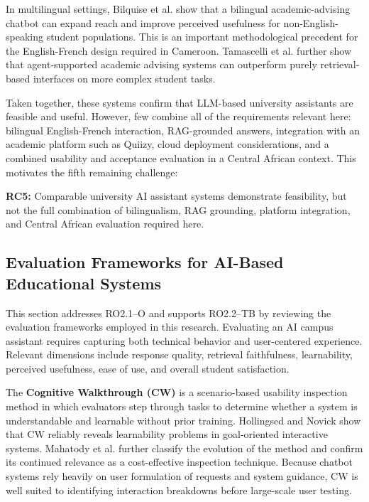 \documentclass[a4paper,9pt,twocolumn]{extarticle}
\begin{document}
In multilingual settings, Bilquise et al. \cite{bilquise2022} show that
a bilingual academic-advising chatbot can expand reach and improve
perceived usefulness for non-English-speaking student populations. This
is an important methodological precedent for the English-French design
required in Cameroon. Tamascelli et al. \cite{tamascelli2025} further
show that agent-supported academic advising systems can outperform
purely retrieval-based interfaces on more complex student tasks.

Taken together, these systems confirm that LLM-based university
assistants are feasible and useful. However, few combine all of the
requirements relevant here: bilingual English-French interaction,
RAG-grounded answers, integration with an academic platform such as
Quiizy, cloud deployment considerations, and a combined usability and
acceptance evaluation in a Central African context. This motivates the
fifth remaining challenge:

\textbf{RC5:} Comparable university AI assistant systems demonstrate
feasibility, but not the full combination of bilingualism, RAG grounding,
platform integration, and Central African evaluation required here.

\subsection{Evaluation Frameworks for AI-Based Educational Systems}
\label{sec:soa:evaluation}

This section addresses RO2.1--O and supports RO2.2--TB by reviewing the
evaluation frameworks employed in this research. Evaluating an AI campus
assistant requires capturing both technical behavior and user-centered
experience. Relevant dimensions include response quality, retrieval
faithfulness, learnability, perceived usefulness, ease of use, and
overall student satisfaction.

The \textbf{Cognitive Walkthrough (CW)} is a scenario-based usability
inspection method in which evaluators step through tasks to determine
whether a system is understandable and learnable without prior training.
Hollingsed and Novick \cite{hollingsed2007} show that CW reliably reveals
learnability problems in goal-oriented interactive systems. Mahatody et
al. \cite{mahatody2010} further classify the evolution of the method and
confirm its continued relevance as a cost-effective inspection technique.
Because chatbot systems rely heavily on user formulation of requests and
system guidance, CW is well suited to identifying interaction breakdowns
before large-scale user testing.
\end{document}
